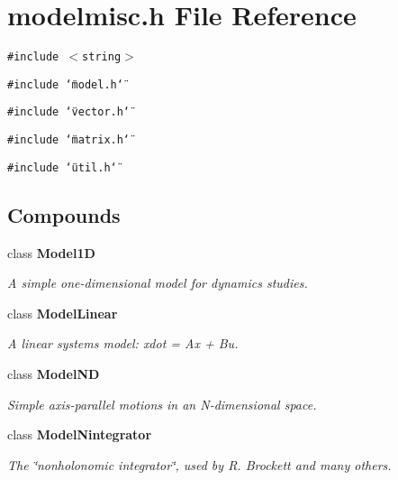 \section{modelmisc.h File Reference}
\label{modelmisc_h}
{\tt \#include $<$string$>$}\par
{\tt \#include \char`\"{}model.h\char`\"{}}\par
{\tt \#include \char`\"{}vector.h\char`\"{}}\par
{\tt \#include \char`\"{}matrix.h\char`\"{}}\par
{\tt \#include \char`\"{}util.h\char`\"{}}\par
\subsection*{Compounds}
\begin{CompactItemize}
\item 
class {\bf Model1D}
\begin{CompactList}\small\item\em A simple one-dimensional model for dynamics studies.\item\end{CompactList}\item 
class {\bf Model\-Linear}
\begin{CompactList}\small\item\em A linear systems model: xdot = Ax + Bu.\item\end{CompactList}\item 
class {\bf Model\-ND}
\begin{CompactList}\small\item\em Simple axis-parallel motions in an N-dimensional space.\item\end{CompactList}\item 
class {\bf Model\-Nintegrator}
\begin{CompactList}\small\item\em The \char`\"{}nonholonomic integrator\char`\"{}, used by R. Brockett and many others.\item\end{CompactList}\end{CompactItemize}
